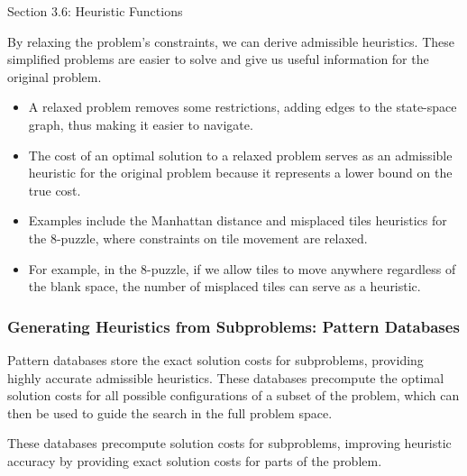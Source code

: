 \begin{notes}{Section 3.6: Heuristic Functions}
    \begin{highlight}
    
    By relaxing the problem's constraints, we can derive admissible heuristics. These simplified problems are easier to solve and give us useful information for the original problem.
    
    \begin{itemize}
        \item A relaxed problem removes some restrictions, adding edges to the state-space graph, thus making it easier to navigate.
        \item The cost of an optimal solution to a relaxed problem serves as an admissible heuristic for the original problem because it represents a lower bound on the true cost.
        \item Examples include the Manhattan distance and misplaced tiles heuristics for the 8-puzzle, where constraints on tile movement are relaxed.
        \item For example, in the 8-puzzle, if we allow tiles to move anywhere regardless of the blank space, the number of misplaced tiles can serve as a heuristic.
    \end{itemize}
    
    \end{highlight}
    
    \subsubsection*{Generating Heuristics from Subproblems: Pattern Databases}
    
    Pattern databases store the exact solution costs for subproblems, providing highly accurate admissible heuristics. These databases precompute the optimal solution costs for all possible 
    configurations of a subset of the problem, which can then be used to guide the search in the full problem space.
    
    \begin{highlight}
    
    These databases precompute solution costs for subproblems, improving heuristic accuracy by providing exact solution costs for parts of the problem.
    

\end{highlight}
\end{notes}
